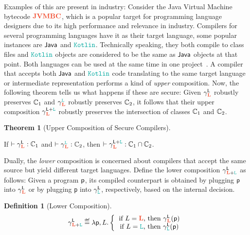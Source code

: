 \documentclass[acmsmall]{acmart}
\theoremstyle{definition}
\newtheorem{theorem}{Theorem}[section]
\newtheorem{definition}{Definition}[section]
\begin{document}
Examples of this are present in industry:
Consider the Java Virtual Machine bytecode $\trg{JVM BC}$, which is a popular target for programming language designers due to its high performance and relevance in industry.
Compilers for several programming languages have it as their target language, some popular instances are $\src{Java}$ and $\obj{Kotlin}$.
Technically speaking, they both compile to class files and $\obj{Kotlin}$ objects are considered to be the same as $\src{Java}$ objects at that point.
Both languages can be used at the same time in one project~\cite{androidstudio}.
A compiler that accepts both $\src{Java}$ and $\obj{Kotlin}$ code translating to the same target language or intermediate representation performs a kind of {\em upper} composition.
Now, the following theorem tells us what happens if these are secure:
Given {$\cc{\src{L}}{\trg{L}}$ robustly preserves $\class[_{1}]$} and {$\cc{\obj{L}}{\trg{L}}$ robustly preserves $\class[_{2}]$}, it follows that {their upper composition $\cc{\src{L}+\obj{L}}{\trg{L}}$ robustly preserves the intersection of classes $\class[_{1}]$ and $\class[_{2}]$}.

\begin{theorem}[Upper Composition of Secure Compilers]\label{thm:urtp}
  $\;$

  If {$\rtp{\cc{\src{L}}{\trg{L}}}{\class[_{1}]}$} and {$\rtp{\cc{\obj{L}}{\trg{L}}}{\class[_{2}]}$}, then {$\rtp{\cc{\src{L}+\obj{L}}{\trg{L}}}{\class[_{1}]\cap\class[_{2}]}$}. %
\end{theorem}

Dually, the {\em lower} composition is concerned about compilers that accept the same source but yield different target languages. %
{Define the lower composition $\cc{\src{L}}{\trg{L}+\obj{L}}$} as follows:
Given a program $\src{p}$, its compiled counterpart is obtained by {plugging $\src{p}$ into $\cc{\src{L}}{\trg{L}}$} or by {plugging \texttt{p} into $\cc{\src{L}}{\obj{L}}$}, respectively, {based on the internal decision}.
\begin{definition}[Lower Composition]
  \[
    \text{{$\cc{\src{L}}{\trg{L}+\obj{L}}$}}\isdef
  \lambda \src{p}, L\ldotp
  \left\{\mbox{\begin{tabular}{c}
    {{if $L=\trg{L}$, then} {$\cc{\src{L}}{\trg{L}}(\src{p})$}} \\
    \mbox{{if $L=\obj{L}$, then} {$\cc{\src{L}}{\obj{L}}(\src{p})$}} \\
  \end{tabular}}\right.\]
\end{definition}
\end{document}
